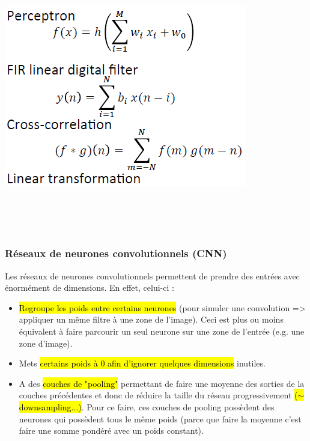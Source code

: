 \documentclass[letterpaper, 12pt]{article}
\newcommand{\alinea}{
\hspace*{0.5cm}}
\begin{document}
			\begin{minipage}{0.39\textwidth}
				\begin{center}
					\includegraphics[width=\textwidth]{Images/nn-filter}
				\end{center}
			\end{minipage}~\\~\\~\\
			\subsubsection{Réseaux de neurones convolutionnels (CNN)}
				\alinea Les réseaux de neurones convolutionnels permettent de prendre des entrées avec énormément de dimensions.
					En effet, celui-ci :
					\begin{itemize}
						\setlength\itemsep{0cm}
						\item \hl{Regroupe les poids entre certains neurones} (pour simuler une convolution => appliquer un même filtre 
							à une zone de l'image). Ceci est plus ou moins équivalent à faire parcourir un seul neurone sur
							une zone de l'entrée (e.g. une zone d'image).
						\item Mets \hl{certains poids à 0 afin d'ignorer quelques dimensions} inutiles.
						\item A des \hl{couches de "pooling"} permettant de faire une moyenne des sorties de la couches précédentes
							et donc de réduire la taille du réseau progressivement \hl{($\sim$downsampling...)}. Pour ce faire,
							ces couches de pooling possèdent des neurones qui possèdent tous le même poids (parce que faire la moyenne
							c'est faire une somme pondéré avec un poids constant).
					\end{itemize}
\end{document}
